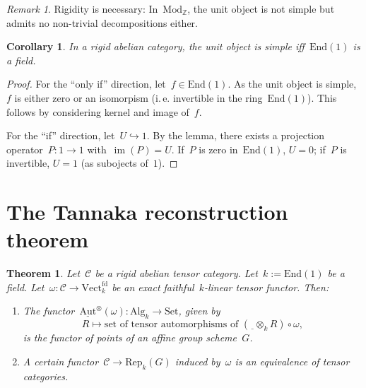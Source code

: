 \documentclass[a4paper,english,12pt]{scrartcl}
\theoremstyle{definition}
\theoremstyle{plain}
\newtheorem{thm}[defn]{Theorem}
\newtheorem{cor}[defn]{Corollary}
\theoremstyle{remark}
\newtheorem{rem}[defn]{Remark}
\newcommand{\ZZ}{\mathbb{Z}}
\newcommand{\C}{\mathcal{C}}
\renewcommand{\_}{\mathpunct{.}\,}
\newcommand{\?}{\,{:}\,}
\newcommand{\Mod}{\mathrm{Mod}}
\newcommand{\Set}{\mathrm{Set}}
\newcommand{\Vect}{\mathrm{Vect}}
\newcommand{\End}{\mathrm{End}}
\newcommand{\freist}{\underline{\ \ }}
\newcommand{\Rep}{\mathrm{Rep}}
\newcommand{\im}{\operatorname{im}}
\begin{document}
\begin{rem}Rigidity is necessary: In~$\Mod_\ZZ$, the unit object is not simple
but admits no non-trivial decompositions either.\end{rem}

\begin{cor}In a rigid abelian category, the unit object is simple iff~$\End(1)$
is a field.\end{cor}
\begin{proof}For the ``only if'' direction, let~$f \in \End(1)$. As the unit
object is simple, $f$ is either zero or an isomorpism (i.\,e. invertible in the
ring~$\End(1)$). This follows by considering kernel and image of~$f$.

For the ``if'' direction, let~$U \hookrightarrow 1$. By the lemma, there exists
a projection operator~$P : 1 \to 1$ with~$\im(P) = U$. If~$P$ is zero
in~$\End(1)$, $U = 0$; if~$P$ is invertible, $U = 1$ (as subojects
of~$1$).\end{proof}


\section{The Tannaka reconstruction theorem}

\begin{thm}Let~$\C$ be a rigid abelian tensor category. Let~$k := \End(1)$ be a
field. Let~$\omega : \C \to \Vect_k^\mathrm{fd}$ be an exact faithful~$k$-linear
tensor functor. Then:
\begin{enumerate}
\item The functor~$\underline{\mathrm{Aut}}^\otimes(\omega) : \mathrm{Alg}_k
\to \Set$, given by
\[ R \longmapsto \text{set of tensor automorphisms of~$(\freist \otimes_k R)
\circ \omega$}, \]
is the functor of points of an affine group scheme~$G$.
\item A certain functor~$\C \to \Rep_k(G)$ induced by~$\omega$ is an
equivalence of tensor categories.
\end{enumerate}
\end{thm}
\end{document}
